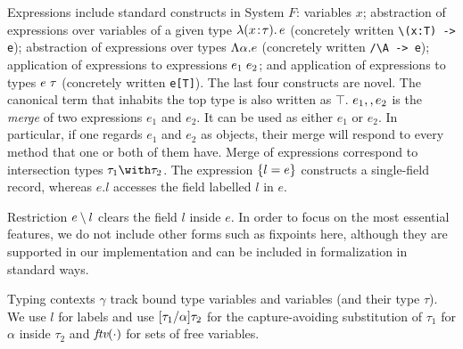Expressions include standard constructs in System
$F$: variables $ x $; abstraction of expressions over variables of a given type
$\lambda (x \!:\! \tau).\, e$ (concretely written \lstinline$\(x:T) -> e$);
abstraction of expressions over types $\Lambda \alpha. e$ (concretely written \lstinline$/\A -> e$);
application of expressions to expressions $e_1 \; e_2$;
and application of expressions to types $e \; \tau$ (concretely written \lstinline$e[T]$).
The last four constructs are novel.
The canonical term that inhabits the top type is also written as $\top$.
$e_1 ,, e_2$ is the \emph{merge} of two expressions $e_1$ and $e_2$.
It can be used as either $ e_1 $ or $ e_2 $. In particular, if one regards $e_1$
and $e_2$ as objects, their merge will respond to every method that one or
both of them have. Merge of expressions correspond to intersection types
$ \tau_1 \andOp \tau_2 $. The expression $ \{ l = e \} $ constructs a
single-field record, whereas $ e.l $ accesses the field labelled $ l $ in $ e $.
\begin{comment}
Note that $ e $ does not
need to be a record type in this case. For example, although the merge of two
records
\[
x = \recordCon {l_1} {e_1} \mergeOp \recordCon {l_1} {e_2}
\]
is of an intersection type, $ x.{l_1} $ still gives $ e_1 $. On the other hand,
$ x.{l_3} $ will be rejected by the type system.
\end{comment}
Restriction $e \setminus l$ clears the field $l$ inside $e$. In order to
focus on the most essential features, we do not include other forms such as
fixpoints here, although they are supported in our implementation and can
be included in formalization in standard ways.

Typing contexts $ \gamma $ track bound type variables and variables (and their
type $\tau$). We use $l$ for labels and use
$\lbrack \tau_1 / \alpha \rbrack {\tau_2}$ for the capture-avoiding substitution of
$\tau_1$ for $\alpha$ inside $\tau_2$ and $\textit{ftv}({\cdot})$ for sets of free
variables.

\begin{comment}
\paragraph{Discussion.} A natural question the reader might ask is that why we
have excluded union types from the language. The answer is we found that
intersection types alone are enough support extensible designs. To focus on the
key features that make this language interesting, we also omit other common
constructs. For example, fixpoints can be added in standard ways.
\end{comment}

